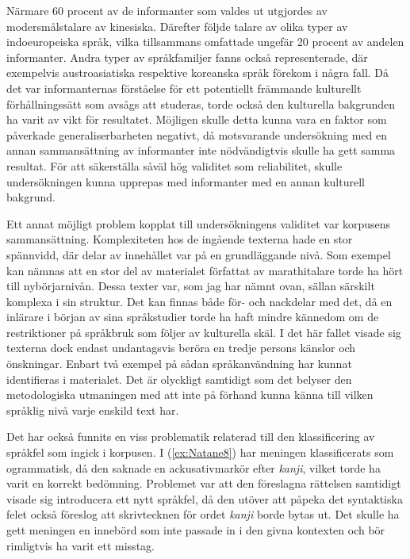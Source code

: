 \documentclass[12pt,a4paper]{article}
\begin{document}
Närmare 60 procent av de informanter som valdes ut utgjordes av modersmålstalare av kinesiska. Därefter följde talare av olika typer av indoeuropeiska språk, vilka tillsammans omfattade ungefär 20 procent av andelen informanter. Andra typer av språkfamiljer fanns också representerade, där exempelvis austroasiatiska respektive koreanska språk förekom i några fall. Då det var informanternas förståelse för ett potentiellt främmande kulturellt förhållningssätt som avsågs att studeras, torde också den kulturella bakgrunden ha varit av vikt för resultatet. Möjligen skulle detta kunna vara en faktor som påverkade generaliserbarheten negativt, då motsvarande undersökning med en annan sammansättning av informanter inte nödvändigtvis skulle ha gett samma resultat. För att säkerställa såväl hög validitet som reliabilitet, skulle undersökningen kunna upprepas med informanter med en annan kulturell bakgrund.

Ett annat möjligt problem kopplat till undersökningens validitet var korpusens sammansättning. Komplexiteten hos de ingående texterna hade en stor spännvidd, där delar av innehållet var på en grundläggande nivå. Som exempel kan nämnas att en stor del av materialet författat av marathitalare torde ha hört till nybörjarnivån. Dessa texter var, som jag har nämnt ovan, sällan särskilt komplexa i sin struktur. Det kan finnas både för- och nackdelar med det, då en inlärare i början av sina språkstudier torde ha haft mindre kännedom om de restriktioner på språkbruk som följer av kulturella skäl. I det här fallet visade sig texterna dock endast undantagsvis beröra en tredje persons känslor och önskningar. Enbart två exempel på sådan språkanvändning har kunnat identifieras i materialet. Det är olyckligt samtidigt som det belyser den metodologiska utmaningen med att inte på förhand kunna känna till vilken språklig nivå varje enskild text har.

Det har också funnits en viss problematik relaterad till den klassificering av språkfel som ingick i korpusen. I (\ref{ex:Natane8}) har meningen klassificerats som ogrammatisk, då den saknade en ackusativmarkör efter \emph{kanji}, vilket torde ha varit en korrekt bedömning. Problemet var att den föreslagna rättelsen samtidigt visade sig introducera ett nytt språkfel, då den utöver att påpeka det syntaktiska felet också föreslog att skrivtecknen för ordet \emph{kanji} borde bytas ut. Det skulle ha gett meningen en innebörd som inte passade in i den givna kontexten och bör rimligtvis ha varit ett misstag.

\begin{exe}
\end{exe}
\end{document}
